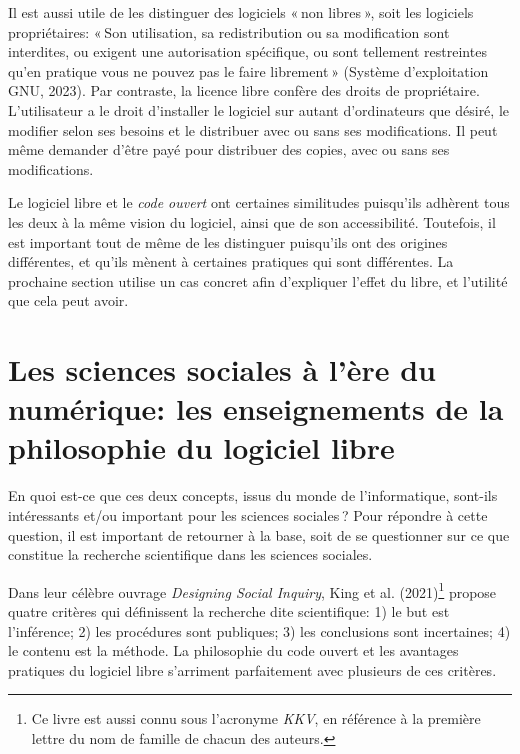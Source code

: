 \documentclass[
  letterpaper,
  DIV=11,
  numbers=noendperiod]{scrreprt}
\begin{document}
Il est aussi utile de les distinguer des logiciels « non libres », soit
les logiciels propriétaires: « Son utilisation, sa redistribution ou sa
modification sont interdites, ou exigent une autorisation spécifique, ou
sont tellement restreintes qu'en pratique vous ne pouvez pas le faire
librement » (Système d'exploitation GNU, 2023). Par contraste, la
licence libre confère des droits de propriétaire. L'utilisateur a le
droit d'installer le logiciel sur autant d'ordinateurs que désiré, le
modifier selon ses besoins et le distribuer avec ou sans ses
modifications. Il peut même demander d'être payé pour distribuer des
copies, avec ou sans ses modifications.

Le logiciel libre et le \emph{code ouvert} ont certaines similitudes
puisqu'ils adhèrent tous les deux à la même vision du logiciel, ainsi
que de son accessibilité. Toutefois, il est important tout de même de
les distinguer puisqu'ils ont des origines différentes, et qu'ils mènent
à certaines pratiques qui sont différentes. La prochaine section utilise
un cas concret afin d'expliquer l'effet du libre, et l'utilité que cela
peut avoir.

\section{Les sciences sociales à l'ère du numérique: les enseignements
de la philosophie du logiciel
libre}\label{les-sciences-sociales-uxe0-luxe8re-du-numuxe9rique-les-enseignements-de-la-philosophie-du-logiciel-libre}

En quoi est-ce que ces deux concepts, issus du monde de l'informatique,
sont-ils intéressants et/ou important pour les sciences sociales ? Pour
répondre à cette question, il est important de retourner à la base, soit
de se questionner sur ce que constitue la recherche scientifique dans
les sciences sociales.

Dans leur célèbre ouvrage \emph{Designing Social Inquiry}, King et al.
(2021)\footnote{Ce livre est aussi connu sous l'acronyme \emph{KKV}, en
  référence à la première lettre du nom de famille de chacun des
  auteurs.} propose quatre critères qui définissent la recherche dite
scientifique: 1) le but est l'inférence; 2) les procédures sont
publiques; 3) les conclusions sont incertaines; 4) le contenu est la
méthode. La philosophie du code ouvert et les avantages pratiques du
logiciel libre s'arriment parfaitement avec plusieurs de ces critères.
\end{document}
